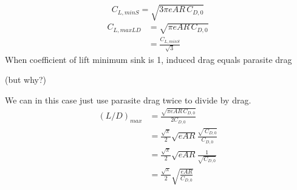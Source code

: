 \documentclass{article}
\begin{document}
\[
C_{L,minS}=\sqrt{3\pi eAR\,C_{D,0}}
\]
\begin{align*}
C_{L,maxLD} & = \sqrt{\pi eAR\,C_{D,0}} \\
& = \frac{C_{L,minS}}{\sqrt{3}}
\end{align*}
When coefficient of lift minimum sink is 1, induced drag equals parasite drag

(but why?)

We can in this case just use parasite drag twice to divide by drag.
\begin{align*}
(L/D)_{max}& = \frac{\sqrt{\pi eAR\,C_{D,0}}}{2 C_{D,0}} \\
& = \frac{\sqrt{\pi}}{2}\sqrt{eAR}\frac{\sqrt{\,C_{D,0}}}{C_{D,0}} \\
& = \frac{\sqrt{\pi}}{2}\sqrt{eAR}\frac{1}{\sqrt{C_{D,0}}} \\
& = \frac{\sqrt{\pi}}{2}\sqrt{\frac{eAR}{C_{D,0}}}
\end{align*}
\end{document}
